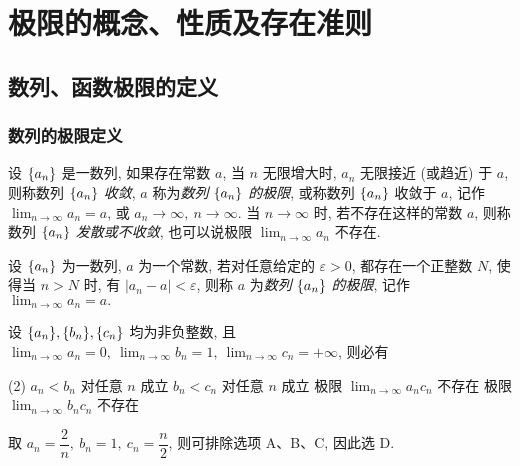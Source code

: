 \section{极限的概念、性质及存在准则}

\subsection{数列、函数极限的定义}

\subsubsection{数列的极限定义}

\begin{definition}[数列极限 A]
    设 $\qty{a_n}$ 是一数列, 如果存在常数 $a$, 当 $n$ 无限增大时, $a_n$ 无限接近 (或趋近) 于 $a$, 则称数列 $\qty{a_n}$ \textit{收敛}, $a$ 称为\textit{数列} $\qty{a_n}$ \textit{的极限}, 
    或称数列 $\qty{a_n}$ 收敛于 $a$, 记作 $\displaystyle\lim_{n\to\infty}a_n=a$, 或 $a_n\to\infty,~n\to\infty$.
    当 $n\to\infty$ 时, 若不存在这样的常数 $a$, 则称数列 $\qty{a_n}$ \textit{发散或不收敛}, 也可以说极限 $\displaystyle\lim_{n\to\infty}a_n$ 不存在.
\end{definition}

\begin{definition}[数列极限 B]
    设 $\qty{a_n}$ 为一数列, $a$ 为一个常数, 若对任意给定的 $\varepsilon>0$, 都存在一个正整数 $N$, 使得当 $n>N$ 时, 有 $|a_n-a|<\varepsilon$, 则称 $a$ 为\textit{数列} $\qty{a_n}$ \textit{的极限}, 记作 $\displaystyle\lim_{n\to\infty}a_n=a.$
\end{definition}

\begin{example}[2003 数一]
    设 $\qty{a_n},\qty{b_n},\qty{c_n}$ 均为非负整数, 且 $\displaystyle\lim_{n\to\infty}a_n=0,~\lim_{n\to\infty}b_n=1,~\lim_{n\to\infty}c_n=+\infty$, 则必有
    \begin{tasks}(2)
        \task $a_n<b_n$ 对任意 $n$ 成立
        \task $b_n<c_n$ 对任意 $n$ 成立
        \task 极限 $\displaystyle\lim_{n\to\infty}a_nc_n$ 不存在
        \task 极限 $\displaystyle\lim_{n\to\infty}b_nc_n$ 不存在
    \end{tasks}
\end{example}
\begin{solution}
    取 $a_n=\dfrac{2}{n},~b_n=1,~c_n=\dfrac{n}{2}$, 则可排除选项 A、B、C, 因此选 D.
\end{solution}

